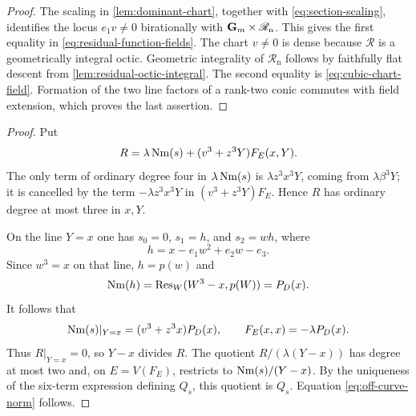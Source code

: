 \begin{proof}
The scaling in \cref{lem:dominant-chart}, together with
\eqref{eq:section-scaling}, identifies the locus $e_1v\ne0$ birationally with
$\mathbf G_m\times\mathscr R_{\mathrm n}$.  This gives the first equality in
\eqref{eq:residual-function-fields}.  The chart $v\ne0$ is dense because
$\mathscr R$ is a geometrically integral octic.  Geometric integrality of
$\mathscr R_{\mathrm n}$ follows by faithfully flat descent from
\cref{lem:residual-octic-integral}.  The second equality is
\eqref{eq:cubic-chart-field}.  Formation of the two line factors of a
rank-two conic commutes with field extension, which proves the last assertion.
\end{proof}


\begin{proof}
Put
\[
 R=\lambda\operatorname{Nm}(s)+(v^3+z^3Y)F_E(x,Y).
\]
The only term of ordinary degree four in $\lambda\operatorname{Nm}(s)$ is
$\lambda z^3x^3Y$, coming from $\lambda\beta^3Y$; it is cancelled by the
term $-\lambda z^3x^3Y$ in $(v^3+z^3Y)F_E$.  Hence $R$ has ordinary degree
at most three in $x,Y$.

On the line $Y=x$ one has $s_0=0$, $s_1=h$, and $s_2=wh$, where
\[
 h=x-e_1w^2+e_2w-e_3.
\]
Since $w^3=x$ on that line, $h=p(w)$ and
\[
 \operatorname{Nm}(h)=\operatorname{Res}_W(W^3-x,p(W))=P_D(x).
\]
It follows that
\[
 \operatorname{Nm}(s)|_{Y=x}=(v^3+z^3x)P_D(x),
 \qquad
 F_E(x,x)=-\lambda P_D(x).
\]
Thus $R|_{Y=x}=0$, so $Y-x$ divides $R$.  The quotient
$R/(\lambda(Y-x))$ has degree at most two and, on $E=V(F_E)$, restricts to
$\operatorname{Nm}(s)/(Y-x)$.  By the uniqueness of the six-term expression defining
$Q_s$, this quotient is $Q_s$.  Equation \eqref{eq:off-curve-norm} follows.
\end{proof}


